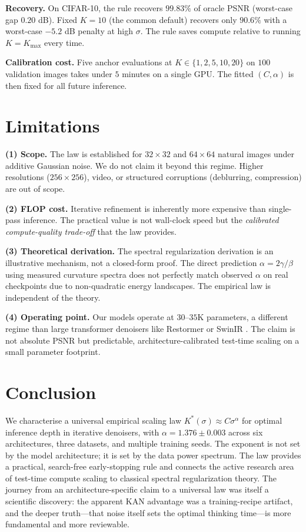 \documentclass[letterpaper]{article}
\begin{document}
\textbf{Recovery.} On CIFAR-10, the rule recovers $99.83\%$ of oracle PSNR (worst-case gap $0.20$ dB). Fixed $K{=}10$ (the common default) recovers only $90.6\%$ with a worst-case $-5.2$ dB penalty at high $\sigma$. The rule saves compute relative to running $K{=}K_{\max}$ every time.

\textbf{Calibration cost.} Five anchor evaluations at $K \in \{1,2,5,10,20\}$ on $100$ validation images takes under $5$ minutes on a single GPU. The fitted $(C, \alpha)$ is then fixed for all future inference.

\section{Limitations}
\label{sec:limitations}

\textbf{(1) Scope.} The law is established for $32{\times}32$ and $64{\times}64$ natural images under additive Gaussian noise. We do not claim it beyond this regime. Higher resolutions ($256{\times}256$), video, or structured corruptions (deblurring, compression) are out of scope.

\textbf{(2) FLOP cost.} Iterative refinement is inherently more expensive than single-pass inference. The practical value is not wall-clock speed but the \emph{calibrated compute-quality trade-off} that the law provides.

\textbf{(3) Theoretical derivation.} The spectral regularization derivation is an illustrative mechanism, not a closed-form proof. The direct prediction $\alpha = 2\gamma/\beta$ using measured curvature spectra does not perfectly match observed $\alpha$ on real checkpoints due to non-quadratic energy landscapes. The empirical law is independent of the theory.

\textbf{(4) Operating point.} Our models operate at $30$--$35$K parameters, a different regime than large transformer denoisers like Restormer \citep{zamir2022restormer} or SwinIR \citep{liang2021swinir}. The claim is not absolute PSNR but predictable, architecture-calibrated test-time scaling on a small parameter footprint.

\section{Conclusion}
\label{sec:conclusion}

We characterise a universal empirical scaling law $K^{*}(\sigma) \approx C\sigma^{\alpha}$ for optimal inference depth in iterative denoisers, with $\alpha = 1.376 \pm 0.003$ across six architectures, three datasets, and multiple training seeds. The exponent is not set by the model architecture; it is set by the data power spectrum. The law provides a practical, search-free early-stopping rule and connects the active research area of test-time compute scaling to classical spectral regularization theory. The journey from an architecture-specific claim to a universal law was itself a scientific discovery: the apparent KAN advantage was a training-recipe artifact, and the deeper truth---that noise itself sets the optimal thinking time---is more fundamental and more reviewable.



\end{document}
